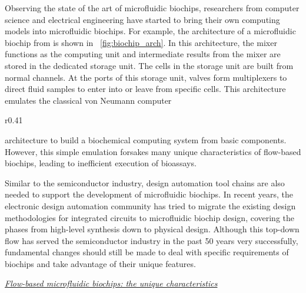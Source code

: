 Observing the state of the art of microfluidic biochips, 
researchers from computer science and 
electrical engineering have
started to bring their own computing models into microfluidic biochips. For
example, the architecture of a microfluidic biochip from
\cite{AminTA09} is shown in \figname~\ref{fig:biochip_arch}.
In this architecture, the 
mixer functions as
the computing unit and intermediate results from the mixer are stored in the
dedicated storage unit. The cells in the storage unit are built from
normal channels. At the ports of this 
storage unit, valves form
multiplexers to direct fluid samples to enter into or leave from specific
cells. This architecture emulates the classical von Neumann computer 
%
\begin{wrapfigure}[16]{r}{0.41\textwidth}
{
  \vskip -6pt
\figurefontsize
\centering

\caption{Computing-based biochip architecture containing a mixer and a dedicated
storage unit with eight cells \cite{AminTA09}.}
\label{fig:biochip_arch}
}
\end{wrapfigure}
%
architecture 
to build a biochemical computing system from basic components. %
However, this simple emulation forsakes many unique characteristics of
flow-based biochips, 
leading to inefficient execution of bioassays.

Similar to the semiconductor industry, design automation tool chains are also needed to 
support the 
development
of microfluidic biochips. In recent years,
the electronic design automation community has tried to migrate the existing
design methodologies for integrated circuits to 
microfluidic biochip design, covering the phases from 
high-level synthesis down to physical design. 
Although this top-down flow has served the semiconductor industry in the past 50 years
very successfully, fundamental changes should still be made to deal with 
specific requirements of biochips and take advantage of their unique
features.
 

\vskip 8pt
\textit{\underline{Flow-based microfluidic biochips: the unique
characteristics}}

